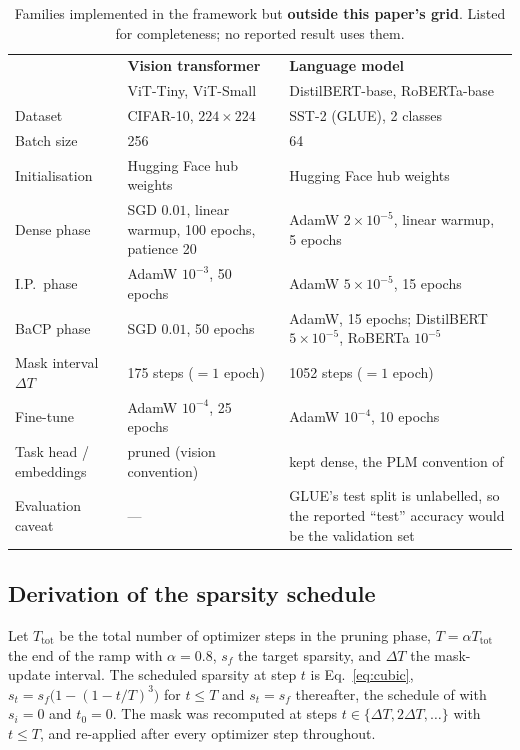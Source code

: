 \begin{table}[h]
\centering
\small
\caption{Families implemented in the framework but \textbf{outside this paper's
grid}. Listed for completeness; no reported result uses them.}
\label{tab:hyp-other}
\begin{tabular}{@{}p{}p{}p{}@{}}
\toprule
 & \textbf{Vision transformer} & \textbf{Language model} \\
 & ViT-Tiny, ViT-Small & DistilBERT-base, RoBERTa-base \\
\midrule
Dataset & CIFAR-10, $224\times224$ & SST-2 (GLUE), 2 classes \\
Batch size & 256 & 64 \\
Initialisation & Hugging Face hub weights & Hugging Face hub weights \\
Dense phase & SGD $0.01$, linear warmup, 100 epochs, patience 20 & AdamW $2\times10^{-5}$, linear warmup, 5 epochs \\
I.P.\ phase & AdamW $10^{-3}$, 50 epochs & AdamW $5\times10^{-5}$, 15 epochs \\
BaCP phase & SGD $0.01$, 50 epochs & AdamW, 15 epochs; DistilBERT $5\times10^{-5}$, RoBERTa $10^{-5}$ \\
Mask interval $\Delta T$ & 175 steps ($=1$ epoch) & 1052 steps ($=1$ epoch) \\
Fine-tune & AdamW $10^{-4}$, 25 epochs & AdamW $10^{-4}$, 10 epochs \\
Task head / embeddings & pruned (vision convention) & kept dense, the PLM convention of \citet{xu2022cap} \\
Evaluation caveat & --- & GLUE's test split is unlabelled, so the reported ``test'' accuracy would be the validation set \\
\bottomrule
\end{tabular}
\end{table}

\subsection{Derivation of the sparsity schedule}

Let $T_{\mathrm{tot}}$ be the total number of optimizer steps in the pruning
phase, $T = \alpha T_{\mathrm{tot}}$ the end of the ramp with $\alpha = 0.8$,
$s_f$ the target sparsity, and $\Delta T$ the mask-update interval. The scheduled
sparsity at step $t$ is Eq.~\eqref{eq:cubic},
$s_t = s_f\big(1 - (1 - t/T)^3\big)$ for $t \le T$ and $s_t = s_f$ thereafter, the
schedule of \citet{zhu2018prune} with $s_i = 0$ and $t_0 = 0$. The mask was
recomputed at steps $t \in \{\Delta T, 2\Delta T, \dots\}$ with $t \le T$, and
re-applied after every optimizer step throughout.

